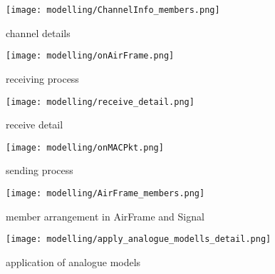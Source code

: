\begin{figure}[h]
 \centering
 \texttt{[image: modelling/ChannelInfo\_members.png]}
 \caption{channel details}
 \label{fig: channel details}
\end{figure}

\begin{figure}[h]
 \centering
 \texttt{[image: modelling/onAirFrame.png]}
 \caption{receiving process}
 \label{fig: receiving process}
\end{figure}

\begin{figure}[h]
 \centering
 \texttt{[image: modelling/receive\_detail.png]}
 \caption{receive detail}
 \label{fig: receive detail}
\end{figure}

\begin{figure}[h]
 \centering
 \texttt{[image: modelling/onMACPkt.png]}
 \caption{sending process}
 \label{fig: sending process}
\end{figure}

\begin{figure}[h]
 \centering
 \texttt{[image: modelling/AirFrame\_members.png]}
 \caption{member arrangement in AirFrame and Signal}
 \label{fig: member AirFrame}
\end{figure}

\begin{figure}[h]
 \centering
 \texttt{[image: modelling/apply\_analogue\_modells\_detail.png]}
 \caption{application of analogue models}
 \label{fig: application analogue models}
\end{figure}

